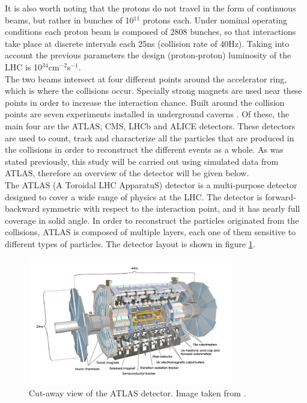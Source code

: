 \documentclass[main]{subfiles} %
\begin{document}
It is also worth noting that the protons do not travel in the form of continuous beams, but rather in bunches of 10$^{11}$ protons each. Under nominal operating conditions each proton beam is composed of 2808 bunches, so that interactions take place at discrete intervals each 25\;ns (collision rate of 40\;Hz). Taking into account the previous parameters the design (proton-proton) luminosity of the LHC is 10$^{34}$\;cm$^{-2}$s$^{-1}$.\\ 

The two beams intersect at four different points around the accelerator ring, which is where the collisions occur. Specially strong magnets are used near these points in order to increase the interaction chance. Built around the collision points are seven experiments installed in underground caverns \cite{Lopes2022}. Of these, the main four are the ATLAS, CMS, LHCb and ALICE detectors. These detectors are used to count, track and characterize all the particles that are produced in the collisions in order to reconstruct the different events as a whole. As was stated previously, this study will be carried out using simulated data from ATLAS, therefore an overview of the detector will be given below.\\

The ATLAS (A Toroidal LHC ApparatuS) detector \cite{Aad2008} is a multi-purpose detector designed to cover a wide range of physics at the LHC. The detector is forward-backward symmetric with respect to the interaction point, and it has nearly full coverage in solid angle. In order to reconstruct the particles originated from the collisions, ATLAS is composed of multiple layers, each one of them sensitive to different types of particles. The detector layout is shown in figure \ref{fig:ATLAS_detector}.\\

\begin{figure}[h]
    \centering
    \includegraphics[width=0.8\textwidth]{../Figures/Theory/ATLAS_detector.png}
    \caption{Cut-away view of the ATLAS detector. Image taken from \cite{Aad2008}.}
    \label{fig:ATLAS_detector}
\end{figure}
\end{document}
